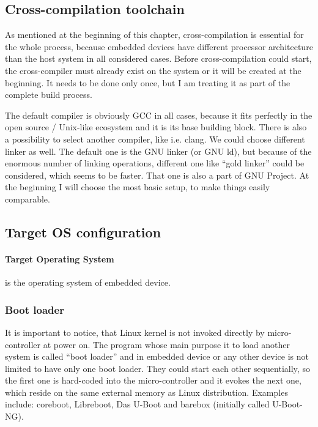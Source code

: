 \documentclass[printmode]{mgr}
\begin{document}
\subsection*{Cross-compilation toolchain}

As mentioned at the beginning of this chapter, cross-compilation is essential for the whole process, because embedded devices have different processor architecture than the host system in all considered cases. Before cross-compilation could start, the cross-compiler must already exist on the system or it will be created at the beginning. It needs to be done only once, but I am treating it as part of the complete build process.

The default compiler is obviously GCC in all cases, because it fits perfectly in the open source / Unix-like ecosystem and it is its base building block. There is also a possibility to select another compiler, like i.e. clang. We could choose different linker as well. The default one is the GNU linker (or GNU ld), but because of the enormous number of linking operations, different one like ``gold linker'' could be considered, which seems to be faster. That one is also a part of GNU Project. At the beginning I will choose the most basic setup, to make things easily comparable. 


\subsection*{Target OS configuration}

\paragraph{Target Operating System} is the operating system of embedded device.

\subsubsection{Boot loader}
It is important to notice, that Linux kernel is not invoked directly by micro-controller at power on. The program whose main purpose it to load another system is called ``boot loader'' and in embedded device or any other device is not limited to have only one boot loader. They could start each other sequentially, so the first one is hard-coded into the micro-controller and it evokes the next one, which reside on the same external memory as Linux distribution. Examples include: coreboot, Libreboot, Das U-Boot and barebox (initially called U-Boot-NG).
\end{document}
